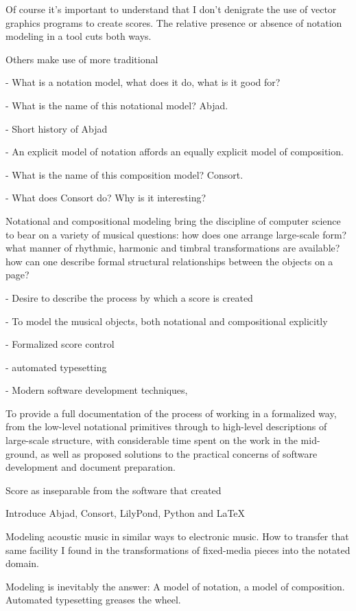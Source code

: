Of course it's important to understand that I don't denigrate the use of vector
graphics programs to create scores. The relative presence or absence of
notation modeling in a tool cuts both ways.

Others make use of more traditional 

- What is a notation model, what does it do, what is it good for?

- What is the name of this notational model? Abjad.

- Short history of Abjad

- An explicit model of notation affords an equally explicit model of
  composition.

- What is the name of this composition model? Consort.

- What does Consort do? Why is it interesting?


Notational and compositional modeling bring the discipline of computer science
to bear on a variety of musical questions: how does one arrange large-scale
form? what manner of rhythmic, harmonic and timbral transformations are
available? how can one describe formal structural relationships between the
objects on a page?


-   Desire to describe the process by which a score is created

-   To model the musical objects, both notational and compositional explicitly

-   Formalized score control

-   automated typesetting

-   Modern software development techniques, 

To provide a full documentation of the process of working in a formalized way,
from the low-level notational primitives through to high-level descriptions of
large-scale structure, with considerable time spent on the work in the
mid-ground, as well as proposed solutions to the practical concerns of software
development and document preparation.

Score as inseparable from the software that created

Introduce Abjad, Consort, LilyPond, Python and \LaTeX{}

Modeling acoustic music in similar ways to electronic music. How to transfer
that same facility I found in the transformations of fixed-media pieces into 
the notated domain.

Modeling is inevitably the answer: A model of notation, a model of composition.
Automated typesetting greases the wheel.

